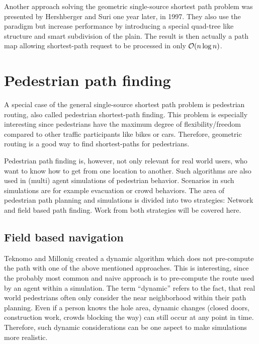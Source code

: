 	Another approach solving the geometric single-source shortest path problem was presented by Hershberger and Suri one year later, in 1997.
	They also use the  paradigm but increase performance by introducing a special quad-tree like structure and smart subdivision of the plain.
	The result is then actually a path map allowing shortest-path request to be processed in only $\mathcal{O}(n \log n)$.
	

\section{Pedestrian path finding}
	
	A special case of the general single-source shortest path problem is pedestrian routing, also called pedestrian shortest-path finding.
	This problem is especially interesting since pedestrians have the maximum degree of flexibility/freedom compared to other traffic participants like bikes or cars.
	Therefore, geometric routing is a good way to find shortest-paths for pedestrians.
	
	Pedestrian path finding is, however, not only relevant for real world users, who want to know how to get from one location to another.
	Such algorithms are also used in (multi) agent simulations of pedestrian behavior.
	Scenarios in such simulations are for example evacuation or crowd behaviors.
	The area of pedestrian path planning and simulations is divided into two strategies: Network and field based path finding\cite[2]{hartmann-geodesic}.
	Work from both strategies will be covered here.
	
	\subsection{Field based navigation}
		
		Teknomo and Millonig created a dynamic algorithm which does not pre-compute the path with one of the above mentioned approaches\cite{teknomo-millonig-routing}.
		This is interesting, since the probably most common and naive approach is to pre-compute the route used by an agent within a simulation.
		The term \enquote{dynamic} refers to the fact, that real world pedestrians often only consider the near neighborhood within their path planning.
		Even if a person knows the hole area, dynamic changes (closed doors, construction work, crowds blocking the way) can still occur at any point in time.
		Therefore, such dynamic considerations can be one aspect to make simulations more realistic.
		
